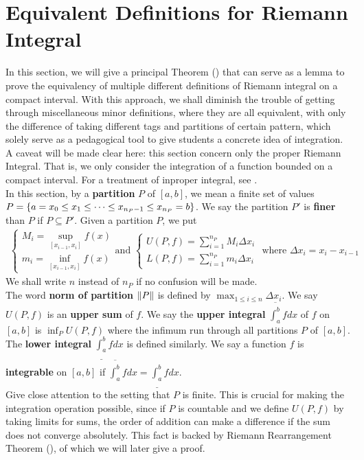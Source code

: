 \documentclass{report}
\begin{document}
\section{Equivalent Definitions for Riemann Integral}
\begin{mdframed}
In this section, we will give a principal Theorem () that can serve as a lemma to prove the equivalency of multiple different definitions of Riemann integral on a compact interval. With this approach, we shall diminish the trouble of getting through miscellaneous minor definitions, where they are all equivalent, with only the difference of taking different tags and partitions of certain pattern, which solely serve as a pedagogical tool to give students a concrete idea of integration.\\

A caveat will be made clear here: this section concern only the proper Riemann Integral. That is, we only consider the integration of a function bounded on a compact interval. For a treatment of inproper integral, see .\\

In this section, by a \textbf{partition} $P$ of $[a,b]$, we mean a finite set of values $P=\{ a=x_0 \leq  x_1 \leq  \cdots \leq  x_{n_P-1} \leq x_{n_P} =b \}$. We say the partition $P'$ is \textbf{finer} than $P$ if $P\subseteq P'$. Given a partition $P$, we put
\begin{align*}
\begin{cases}  
M_i=\sup_{[x_{i-1},x_i]} f(x)\\
m_i=\inf_{[x_{i-1},x_i]}f(x)
\end{cases}\text{and }\begin{cases}
  U(P,f)=\sum_{i=1}^{n_P} M_i \Delta x_i\\
  L(P,f)=\sum_{i=1}^{n_P}m_i\Delta x_i
\end{cases}\text{ where }\Delta x_i= x_i-x_{i-1}
\end{align*}
We shall write $n$ instead of $n_P$ if no confusion will be made.\\


The word \textbf{norm of partition} $\| P \|$ is defined by $\max_{1\leq i\leq n} \Delta x_i$. We say $U(P,f)$ is an \textbf{upper sum} of $f$. We say the \textbf{upper integral} $\overline{\int_a^b}fdx$ of $f$ on $[a,b]$ is $\inf_P U(P,f)$ where the infimum run through all partitions $P$ of $[a,b]$. The \textbf{lower integral} $\underline{\int_a^b}fdx$ is defined similarly. We say a function $f$ is \textbf{integrable} on $[a,b]$ if   $\overline{\int_a^b}fdx=\underline{\int_a^b}fdx$.\\

Give close attention to the setting that $P$ is finite. This is crucial for making the integration operation possible, since if  $P$ is countable and we define $U(P,f)$ by taking limits for sums, the order of addition can make a difference if the sum does not converge absolutely. This fact is backed by Riemann Rearrangement Theorem  (), of which we will later give a proof.
\end{mdframed}
\end{document}
